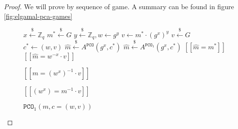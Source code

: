 \documentclass[journal=tches,submission]{iacrtrans}
\newcommand{\pco}{\texttt{PCO}}
\newcommand{\leftsample}{\stackrel{\$}{\leftarrow}}
\newcommand{\llbrack}{[\![}
\newcommand{\rrbrack}{]\!]}
\begin{document}
\begin{proof}
    We will prove by sequence of game. A summary can be found in figure \ref{fig:elgamal-pca-games}

    \begin{figure}
        \centering

        \begin{minipage}[t]{0.4\textwidth}
            \begin{algorithm}[H]
                \caption*{$G_0 - G_2$}
                \begin{algorithmic}[1]
                    \State $x \leftsample \mathbb{Z}_q$
                    \State $m^\ast \leftsample G$
                    \State $y \leftsample \mathbb{Z}_q, w \leftarrow g^y$
                    \State $v \leftarrow m^\ast \cdot (g^x)^y$
                    \State $v \leftsample G$
                    \State $c^\ast \leftarrow (w, v)$
                    \State $\hat{m} \leftsample A^{\pco}(g^x, c^\ast)$
                    \State $\hat{m} \leftsample A^{\pco_1}(g^x, c^\ast)$
                    \State \Return $\llbrack \hat{m} = m^\ast \rrbrack$
                    \State \Return $\llbrack \hat{m} = w^{-x}\cdot v \rrbrack$
                \end{algorithmic}
            \end{algorithm}
        \end{minipage}
        \begin{minipage}[t]{0.4\textwidth}
            \begin{algorithm}[H]
                \caption*{$\pco(m, c=(w, v))$}
                \begin{algorithmic}[1]
                    \State \Return $\llbrack m = (w^x)^{-1}\cdot v\rrbrack$
                \end{algorithmic}
            \end{algorithm}
            \begin{algorithm}[H]
                \caption*{$\pco_1(m, c=(w, v))$}
                \begin{algorithmic}[1]
                    \State \Return $\llbrack (w^x) = m^{-1} \cdot v \rrbrack$
                \end{algorithmic}
            \end{algorithm}
        \end{minipage}


\end{figure}
\end{proof}
\end{document}
